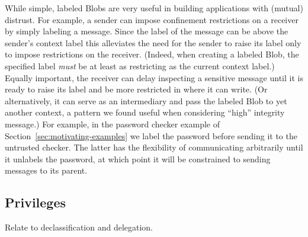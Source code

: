 While simple, labeled Blobs are very useful in building applications
with (mutual) distrust.
%
For example, a sender can impose confinement restrictions on a
receiver by simply labeling a message.
%
Since the label of the message can be above the sender's context label
this alleviates the need for the sender to raise its label only to
impose restrictions on the receiver.
%
(Indeed, when creating a labeled Blob, the specified label \emph{must}
be at least as restricting as the current context label.)
%
Equally important, the receiver can delay inspecting a sensitive
message until it is ready to raise its label and be more restricted in
where it can write.
%
(Or alternatively, it can serve as an intermediary and pass the
labeled Blob to yet another context, a pattern we found useful when
considering ``high'' integrity message.)
%
For example, in the password checker example of
Section~\ref{sec:motivating-examples} we label the password
 before sending it to the untrusted checker.
%
The latter has the flexibility of communicating arbitrarily until it
unlabels the password, at which point it will be constrained to
sending messages to its parent.


\subsection{Privileges}
\label{sec:system:privileges}
Relate to declassification and delegation.






